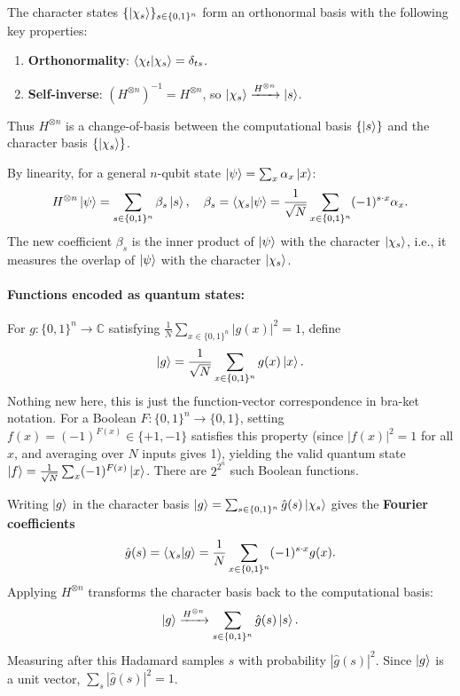 The character states $\{\ket{\chi_s}\}_{s \in \{0,1\}^n}$ form an orthonormal basis with the following key properties:
\begin{enumerate}
    \item \textbf{Orthonormality}: $\braket{\chi_t}{\chi_s} = \delta_{ts}$.
    \item \textbf{Self-inverse}: $(H^{\otimes n})^{-1} = H^{\otimes n}$, so $\ket{\chi_s} \xrightarrow{H^{\otimes n}} \ket{s}$.
\end{enumerate}
Thus $H^{\otimes n}$ is a change-of-basis between the computational basis $\{\ket{s}\}$ and the character basis $\{\ket{\chi_s}\}$.

By linearity, for a general $n$-qubit state $\ket{\psi} = \sum_x \alpha_x\ket{x}$:
\begin{align*}
    H^{\otimes n}\ket{\psi} = \sum_{s \in \{0,1\}^n}\beta_s\ket{s}, \quad \beta_s = \braket{\chi_s}{\psi} = \frac{1}{\sqrt{N}}\sum_{x \in \{0,1\}^n}(-1)^{s \cdot x}\alpha_x.
\end{align*}
The new coefficient $\beta_s$ is the inner product of $\ket{\psi}$ with the character $\ket{\chi_s}$, i.e., it measures the overlap of $\ket{\psi}$ with the character $\ket{\chi_s}$.

\paragraph{Functions encoded as quantum states:} For $g: \{0,1\}^n \to \mathbb{C}$ satisfying $\frac{1}{N}\sum_{x \in \{0,1\}^n}|g(x)|^2 = 1$, define
\begin{align*}
    \ket{g} = \frac{1}{\sqrt{N}}\sum_{x \in \{0,1\}^n}g(x)\ket{x}.
\end{align*}
Nothing new here, this is just the function-vector correspondence in bra-ket notation. For a Boolean $F: \{0,1\}^n \to \{0,1\}$, setting $f(x) = (-1)^{F(x)} \in \{+1,-1\}$ satisfies this property (since $|f(x)|^2 = 1$ for all $x$, and averaging over $N$ inputs gives 1), yielding the valid quantum state $\ket{f} = \frac{1}{\sqrt{N}}\sum_x (-1)^{F(x)}\ket{x}$. There are $2^{2^n}$ such Boolean functions.

Writing $\ket{g}$ in the character basis $\ket{g} = \sum_{s \in \{0,1\}^n}\hat{g}(s)\ket{\chi_s}$ gives the \textbf{Fourier coefficients}
\begin{align*}
     \hat{g}(s) = \braket{\chi_s}{g} = \frac{1}{N}\sum_{x \in \{0,1\}^n}(-1)^{s \cdot x}g(x).
\end{align*}
Applying $H^{\otimes n}$ transforms the character basis back to the computational basis:
\begin{align*}
    \ket{g} \xrightarrow{H^{\otimes n}} \sum_{s \in \{0,1\}^n}\hat{g}(s)\ket{s}.
\end{align*}
Measuring after this Hadamard samples $s$ with probability $|\hat{g}(s)|^2$. Since $\ket{g}$ is a unit vector, $\sum_s |\hat{g}(s)|^2 = 1$.

